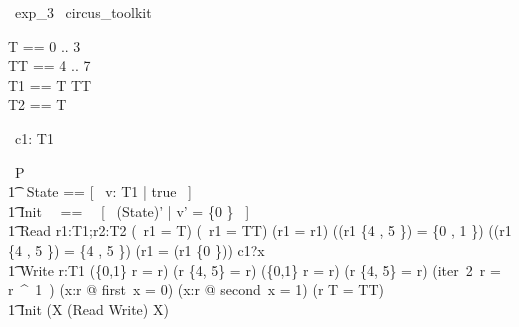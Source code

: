 
\begin{zsection}
  \SECTION\ exp\_3 \parents\ circus\_toolkit
\end{zsection}

\begin{zed}
	T == 0 .. 3 \\
	TT == 4 .. 7 \\
	T1 == T \rel TT \\
    T2 == \id T \\
\end{zed}

\begin{circus}
	\circchannel\ c1: T1 \\
\end{circus}

\begin{circus}
    \circprocess\ P \circdef \circbegin \\
        \t1 \circstate\ State == [~ v: T1 | true ~] \\
        \t1 Init ~~==~~ [~ (State)' | v' = \{0 \} ~] \\
        \t1 Read \circdef \circvar r1:T1;r2:T2 \circspot \lcircguard (\dom~r1 = T) \land (\ran~r1 = TT) \land (r1 \inv = r1) \land ((r1 \comp \{4 , 5  \}) = \{0 , 1 \}) \land ((r1 \circ \{4 , 5  \}) = \{4 , 5 \}) \land (r1 = (r1 \oplus \{0 \})) \rcircguard \circguard c1?x  \then \Skip \\
        \t1 Write \circdef \circvar r:T1 \circspot \lcircguard (\{0,1\} \dres r = r) \land (r \rres \{4, 5\} = r) \land (\{0,1\} \ndres r = r) \land (r \nrres \{4, 5\} = r) \land (iter~2~r = r~^{~1~}) \land (\forall x:r @ first~x = 0) \land (\forall x:r @ second~x = 1) \land (r \limg T \rimg = TT) \rcircguard \circguard \Skip \\
        \t1 \circspot \lschexpract Init \rschexpract \circseq (\circmu X \circspot (Read \extchoice Write) \circseq X) \\ 
	\circend
\end{circus}

